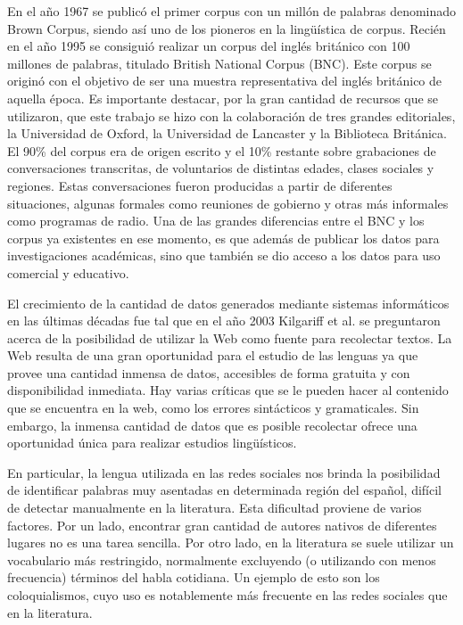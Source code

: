 En el año 1967 se publicó el primer corpus con un millón de palabras denominado Brown Corpus, siendo así uno de los pioneros en la lingüística de corpus. Recién en el año 1995 se consiguió realizar un corpus del inglés británico con 100 millones de palabras, titulado British National Corpus (BNC). 
Este corpus se originó con el objetivo de ser una muestra representativa del inglés británico de aquella época. 
Es importante destacar, por la gran cantidad de recursos que se utilizaron, que este trabajo se hizo con la colaboración de tres grandes editoriales, la Universidad de Oxford, la Universidad de Lancaster y la Biblioteca Británica. 
El 90\% del corpus era de origen escrito y el 10\% restante sobre grabaciones de conversaciones transcritas, de voluntarios de distintas edades, clases sociales y regiones. 
Estas conversaciones fueron producidas a partir de diferentes situaciones, algunas formales como reuniones de gobierno y otras más informales como programas de radio. 
Una de las grandes diferencias entre el BNC y los corpus ya existentes en ese momento, es que además de publicar los datos para investigaciones académicas, sino que también se dio acceso a los datos para uso comercial y educativo.

El crecimiento de la cantidad de datos generados mediante sistemas informáticos en las últimas décadas fue tal que en el año 2003 Kilgariff et al. \cite{kilgarriff2003introduction} se preguntaron acerca de la posibilidad de utilizar la Web como fuente para recolectar textos.
La Web resulta de una gran oportunidad para el estudio de las lenguas ya que provee una cantidad inmensa de datos, accesibles de forma gratuita y con disponibilidad inmediata. Hay varias críticas que se le pueden hacer al contenido que se encuentra en la web, como los errores sintácticos y  gramaticales. Sin embargo, la inmensa cantidad de datos que es posible recolectar ofrece una oportunidad única para realizar estudios lingüísticos.

En particular, la lengua utilizada en las redes sociales nos brinda la posibilidad de identificar palabras muy asentadas en determinada región del español, difícil de detectar manualmente en la literatura. Esta dificultad proviene de varios factores. Por un lado, encontrar gran cantidad de autores nativos de diferentes lugares no es una tarea sencilla. Por otro lado, en la literatura se suele utilizar un vocabulario más restringido, normalmente excluyendo (o utilizando con menos frecuencia) términos del habla cotidiana. Un ejemplo de esto son los coloquialismos, cuyo uso es notablemente más frecuente en las redes sociales que en la literatura. 

